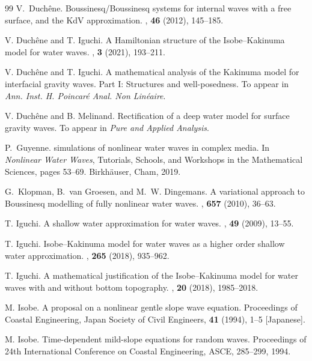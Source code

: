\documentclass[11pt,leqno]{article}
\numberwithin{equation}{section}
\numberwithin{figure}{section}
\begin{document}
\begin{thebibliography}{99}
V.~Duch\^ene.
\newblock Boussinesq/{B}oussinesq systems for internal waves with a free surface, and the {K}d{V} approximation. 
, {\bf 46} (2012), 145--185.

V. Duch\^ene and T. Iguchi. 
\newblock A Hamiltonian structure of the Isobe--Kakinuma model for water waves. 
, {\bf 3} (2021), 193--211.

V. Duch\^ene and T. Iguchi. 
\newblock A mathematical analysis of the Kakinuma model for interfacial gravity waves. Part I: Structures and well-posedness. 
\newblock To appear in {\em Ann. Inst. H. Poincar\'{e} Anal. Non Lin\'{e}aire}. 

V. Duch\^ene and B. Melinand. 
\newblock Rectification of a deep water model for surface gravity waves. 
\newblock To appear in {\em Pure and Applied Analysis}.%

P.~Guyenne.
 simulations of nonlinear water waves in complex media.
\newblock In {\em {N}onlinear {W}ater {W}aves}, Tutorials, Schools, and Workshops in the Mathematical Sciences, pages 53--69. Birkhäuser, Cham, 2019.

G.~Klopman, B.~van Groesen, and M.~W. Dingemans. 
\newblock A variational approach to {B}oussinesq modelling of fully nonlinear water waves. 
, {\bf 657} (2010), 36--63.

T. Iguchi. 
\newblock A shallow water approximation for water waves. 
, {\bf 49} (2009), 13--55. 

T. Iguchi. 
\newblock Isobe--Kakinuma model for water waves as a higher order shallow water approximation. 
, {\bf 265} (2018), 935--962.

T. Iguchi. 
\newblock A mathematical justification of the Isobe--Kakinuma model for water waves with and without bottom topography. 
, {\bf 20} (2018), 1985--2018. 

M. Isobe. 
\newblock A proposal on a nonlinear gentle slope wave equation. 
\newblock Proceedings of Coastal Engineering, Japan Society of Civil Engineers, {\bf 41} (1994), 1--5 [Japanese]. 

M. Isobe. 
\newblock Time-dependent mild-slope equations for random waves. 
\newblock Proceedings of 24th International Conference on Coastal Engineering, ASCE, 285--299, 1994.


\end{thebibliography}
\end{document}
